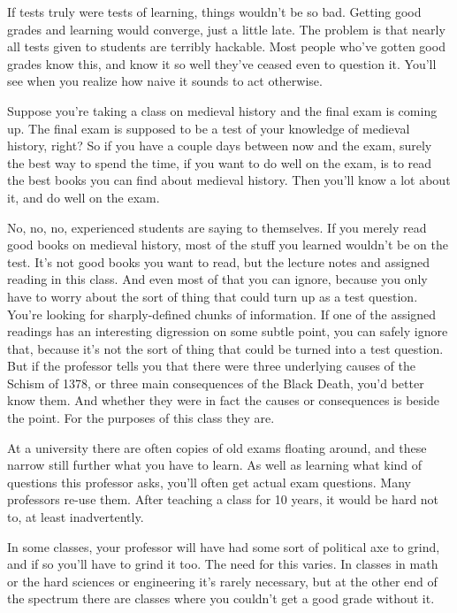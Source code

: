 If tests truly were tests of learning, things wouldn't be so bad.
Getting good grades and learning would converge, just a little late. The
problem is that nearly all tests given to students are terribly
hackable. Most people who've gotten good grades know this, and know it
so well they've ceased even to question it. You'll see when you realize
how naive it sounds to act otherwise.

Suppose you're taking a class on medieval history and the final exam is
coming up. The final exam is supposed to be a test of your knowledge of
medieval history, right? So if you have a couple days between now and
the exam, surely the best way to spend the time, if you want to do well
on the exam, is to read the best books you can find about medieval
history. Then you'll know a lot about it, and do well on the exam.

No, no, no, experienced students are saying to themselves. If you merely
read good books on medieval history, most of the stuff you learned
wouldn't be on the test. It's not good books you want to read, but the
lecture notes and assigned reading in this class. And even most of that
you can ignore, because you only have to worry about the sort of thing
that could turn up as a test question. You're looking for
sharply-defined chunks of information. If one of the assigned readings
has an interesting digression on some subtle point, you can safely
ignore that, because it's not the sort of thing that could be turned
into a test question. But if the professor tells you that there were
three underlying causes of the Schism of 1378, or three main
consequences of the Black Death, you'd better know them. And whether
they were in fact the causes or consequences is beside the point. For
the purposes of this class they are.

At a university there are often copies of old exams floating around, and
these narrow still further what you have to learn. As well as learning
what kind of questions this professor asks, you'll often get actual exam
questions. Many professors re-use them. After teaching a class for 10
years, it would be hard not to, at least inadvertently.

In some classes, your professor will have had some sort of political axe
to grind, and if so you'll have to grind it too. The need for this
varies. In classes in math or the hard sciences or engineering it's
rarely necessary, but at the other end of the spectrum there are classes
where you couldn't get a good grade without it.

